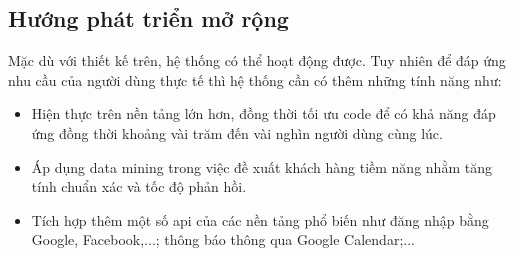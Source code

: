 \documentclass[12pt,a4paper]{article}
\begin{document}
    \subsection{Hướng phát triển mở rộng}
    Mặc dù với thiết kế trên, hệ thống có thể hoạt động được. Tuy nhiên để đáp ứng nhu cầu của người dùng thực tế thì hệ thống cần có thêm những tính năng như:
    \begin{itemize}
        \item Hiện thực trên nền tảng lớn hơn, đồng thời tối ưu code để có khả năng đáp ứng đồng thời khoảng vài trăm đến vài nghìn người dùng cùng lúc.
        \item Áp dụng data mining trong việc đề xuất khách hàng tiềm năng nhằm tăng tính chuẩn xác và tốc độ phản hồi.
        \item Tích hợp thêm một số api của các nền tảng phổ biến như đăng nhập bằng Google, Facebook,...; thông báo thông qua Google Calendar;...
    \end{itemize}
\end{document}
